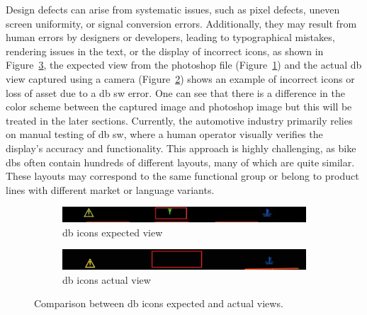 Design defects can arise from systematic issues, such as pixel defects, uneven screen uniformity, or signal conversion errors. Additionally, they may result from human errors by designers or developers, leading to typographical mistakes, rendering issues in the text, or the display of incorrect icons, as shown in Figure~\ref{fig:CombinedIcons}, the expected view from the photoshop file (Figure~\ref{fig:IconExpectedView}) and the actual \gls{db} view captured using a camera (Figure~\ref{fig:IconOutputView}) shows an example of incorrect icons or loss of asset due to a \gls{db} \gls{sw} error. One can see that there is a difference in the color scheme between the captured image and photoshop image but this will be treated in the later sections. Currently, the automotive industry primarily relies on manual testing of \gls{db} \gls{sw}, where a human operator visually verifies the display's accuracy and functionality. This approach is highly challenging, as bike \gls{db}s often contain hundreds of different layouts, many of which are quite similar. These layouts may correspond to the same functional group or belong to product lines with different market or language variants.

\begin{figure}[!ht]
    \centering

    \begin{subfigure}[b]{0.8\textwidth}
        \centering
        \includegraphics[width=\textwidth]{Figures/GRA_Telltale_ON_ExpectedResult.jpg}
        \caption{\gls{db} icons expected view}
        \label{fig:IconExpectedView}
    \end{subfigure}
    \vskip 0.5cm
    \begin{subfigure}[b]{0.8\textwidth}
        \centering
        \includegraphics[width=\textwidth]{Figures/GRA_Telltale_OFF_DashboardFailure.jpg}
        \caption{\gls{db} icons actual view}
        \label{fig:IconOutputView}
    \end{subfigure}
    
    \caption{Comparison between \gls{db} icons expected and actual views.}
    \label{fig:CombinedIcons}
\end{figure}

